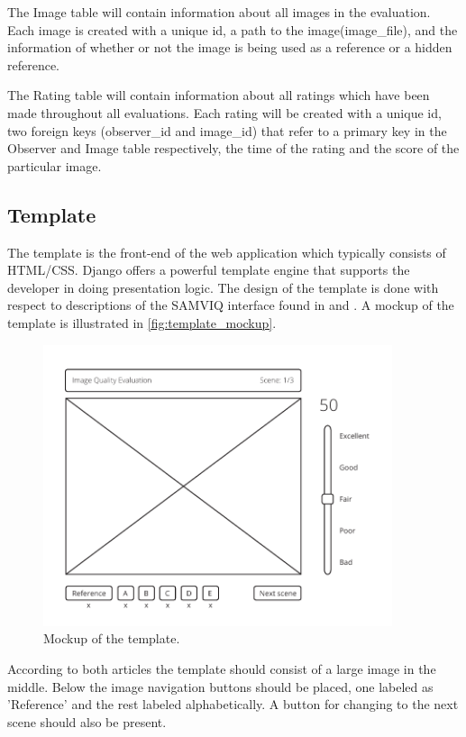 The Image table will contain information about all images in the evaluation. Each image is created with a unique id, a path to the image(image\_file), and the information of whether or not the image is being used as a reference or a hidden reference.

The Rating table will contain information about all ratings which have been made throughout all evaluations. Each rating will be created with a unique id, two foreign keys (observer\_id and image\_id) that refer to a primary key in the Observer and Image table respectively, the time of the rating and the score of the particular image.


\subsection{Template} %
\label{sub:template}

The template is the front-end of the web application which typically consists of HTML/CSS. Django offers a powerful template engine that supports the developer in doing presentation logic. The design of the template is done with respect to descriptions of the SAMVIQ interface found in \cite{InternationalTelecommunicationUnion2007} and \cite{Street}. A mockup of the template is illustrated in \autoref{fig:template_mockup}.

\begin{figure}[H]
	\centering
	\includegraphics[width = 290pt]{Img/mockup.pdf}
	\caption{Mockup of the template.}
	\label{fig:template_mockup}
\end{figure}

According to both articles the template should consist of a large image in the middle. Below the image navigation buttons should be placed, one labeled as 'Reference' and the rest labeled alphabetically. A button for changing to the next scene should also be present. 

